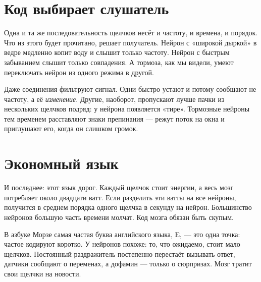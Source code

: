 
\section*{Код выбирает слушатель}

Одна и та же последовательность щелчков несёт и частоту, и времена, и порядок. Что из этого будет прочитано, решает получатель. Нейрон с «широкой дыркой» в ведре медленно копит воду и слышит только частоту. Нейрон с быстрым забыванием слышит только совпадения. А тормоза, как мы видели, умеют переключать нейрон из одного режима в другой.

Даже соединения фильтруют сигнал. Одни быстро устают и потому сообщают не частоту, а её \emph{изменение}. Другие, наоборот, пропускают лучше пачки из нескольких щелчков подряд: у нейрона появляется «тире». Тормозные нейроны тем временем расставляют знаки препинания --- режут поток на окна и приглушают его, когда он слишком громок.

\section*{Экономный язык}

И последнее: этот язык дорог. Каждый щелчок стоит энергии, а весь мозг потребляет около двадцати ватт. Если разделить эти ватты на все нейроны, получится в среднем порядка одного щелчка в секунду на нейрон. Большинство нейронов большую часть времени молчат. Код мозга обязан быть скупым.

В азбуке Морзе самая частая буква английского языка, E, --- это одна точка: частое кодируют коротко. У нейронов похоже: то, что ожидаемо, стоит мало щелчков. Постоянный раздражитель постепенно перестаёт вызывать ответ, датчики сообщают о переменах, а дофамин --- только о сюрпризах. Мозг тратит свои щелчки на новости.

